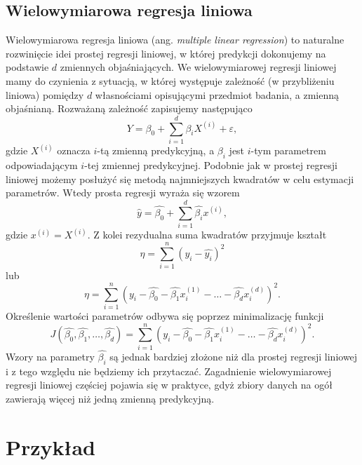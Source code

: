 \documentclass[a4paper]{article}
\begin{document}
\subsection{Wielowymiarowa regresja liniowa}
Wielowymiarowa regresja liniowa (ang. \textit{multiple linear regression}) to naturalne rozwinięcie idei prostej regresji liniowej, w której predykcji dokonujemy na podstawie $d$ zmiennych objaśniających. We wielowymiarowej regresji liniowej mamy do czynienia z sytuacją, w której występuje zależność (w przybliżeniu liniowa) pomiędzy $d$ własnościami opisującymi przedmiot badania, a zmienną objaśnianą. Rozważaną zależność zapisujemy następująco 
\begin{equation}
    Y = \beta_0 + \sum\limits_{i=1}^d{\beta_iX^{(i)}} + \varepsilon,
\end{equation}
gdzie $X^{(i)}$ oznacza $i$-tą zmienną predykcyjną, a $\beta_i$ jest $i$-tym parametrem odpowiadającym $i$-tej zmiennej predykcyjnej. Podobnie jak w prostej regresji liniowej możemy posłużyć się metodą najmniejszych kwadratów w celu estymacji parametrów. Wtedy prosta regresji wyraża się wzorem
\begin{equation}
    \hat{y} = \hat{\beta_0} + \sum\limits_{i=1}^d{\hat{\beta_i}x^{(i)}},
\end{equation}
gdzie $x^{(i)} = X^{(i)}$. Z kolei rezydualna suma kwadratów przyjmuje kształt  
\begin{equation}
    \eta = \sum\limits_{i=1}^n{(y_i - \hat{y_i})^2}
\end{equation}
lub
\begin{equation}
    \eta = \sum\limits_{i=1}^n{(y_i - \hat{\beta_{0}} -\hat{\beta_{1}}x_{i}^{(1)} -\dots-\hat{\beta_{d}}x_{i}^{(d)})^2}.
\end{equation}
Określenie wartości parametrów odbywa się poprzez minimalizację funkcji 
\begin{equation}
    J(\hat{\beta_{0}},\hat{\beta_{1}}, \dots,\hat{\beta_{d}}) = \sum\limits_{i=1}^n{(y_i - \hat{\beta_{0}} -\hat{\beta_{1}}x_{i}^{(1)} -\dots-\hat{\beta_{d}}x_{i}^{(d)})^2}.
\end{equation}
Wzory na parametry $\hat{\beta_i}$ są jednak bardziej złożone niż dla prostej regresji liniowej i z tego względu nie będziemy ich przytaczać. Zagadnienie wielowymiarowej regresji liniowej częściej pojawia się w praktyce, gdyż zbiory danych na ogół zawierają więcej niż jedną zmienną predykcyjną. 

\section{Przykład}
\end{document}

